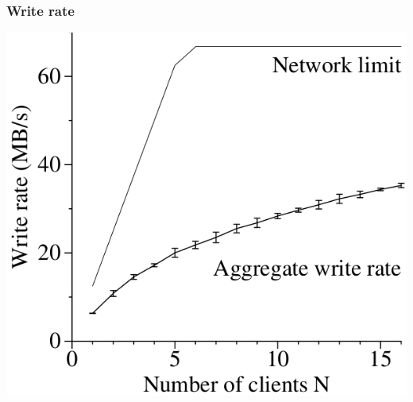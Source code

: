 \documentclass{beamer}
\begin{document}
\begin{frame}
 \frametitle{Write rate}
 \ratemehspace
 \includegraphics[height=\ratemesoption]{figures/GFSwrites.png}
\end{frame}
\end{document}
